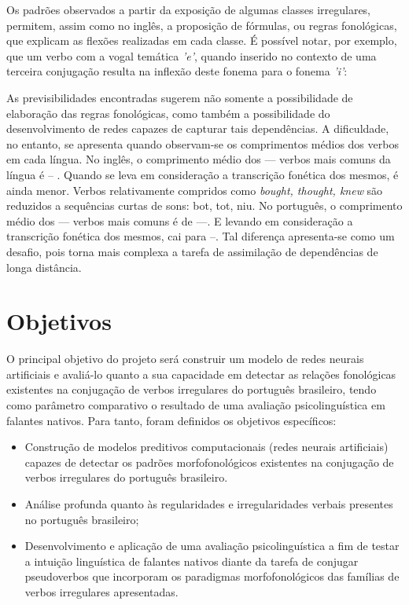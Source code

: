 Os padrões observados a partir da exposição de algumas classes irregulares, permitem, assim como no inglês, a proposição de fórmulas, ou regras fonológicas, que explicam as flexões realizadas em cada classe. É possível notar, por exemplo, que um verbo com a vogal temática \textit{'e'}, quando inserido no contexto de uma terceira conjugação resulta na inflexão deste fonema para o fonema \textit{'i'}:


As previsibilidades encontradas sugerem não somente a possibilidade de elaboração das regras fonológicas, como também a possibilidade do desenvolvimento de redes capazes de capturar tais dependências. A dificuldade, no entanto, se apresenta quando observam-se os comprimentos médios dos verbos em cada língua. No inglês, o comprimento médio dos --- verbos mais comuns da língua é -- %
. Quando se leva em consideração a transcrição fonética dos mesmos, é ainda menor. Verbos relativamente compridos como \textit{bought, thought, knew} são reduzidos a sequências curtas de sons: bot, tot, niu. %
No português, o comprimento médio dos --- verbos mais comuns é de ---. E levando em consideração a transcrição fonética dos mesmos, cai para --. %
Tal diferença apresenta-se como um desafio, pois torna mais complexa a tarefa de assimilação de dependências de longa distância.

\section{Objetivos}
\label{sec:objectives}

O principal objetivo do projeto será construir um modelo de redes neurais artificiais e avaliá-lo quanto a sua capacidade em detectar as relações fonológicas existentes na conjugação de verbos irregulares do português brasileiro, tendo como parâmetro comparativo o resultado de uma avaliação psicolinguística em falantes nativos.
Para tanto, foram definidos os objetivos específicos:

\begin{itemize}
\item Construção de modelos preditivos computacionais (redes neurais artificiais) capazes de detectar os padrões morfofonológicos existentes na conjugação de verbos irregulares do português brasileiro.

\item Análise profunda quanto às regularidades e irregularidades verbais presentes no português brasileiro;

\item Desenvolvimento e aplicação de uma avaliação psicolinguística a fim de testar a intuição linguística de falantes nativos diante da tarefa de conjugar pseudoverbos que incorporam os paradigmas morfofonológicos das famílias de verbos irregulares apresentadas.

\end{itemize}

